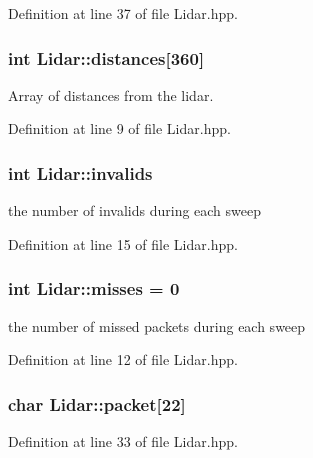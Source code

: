 Definition at line 37 of file Lidar.\-hpp.

\hypertarget{classLidar_a5f97323ace606c1b4d2f817ebb8ebf7d}{
\subsubsection[{distances}]{\setlength{\rightskip}{0pt plus 5cm}int Lidar\-::distances\mbox{[}360\mbox{]}}}\label{classLidar_a5f97323ace606c1b4d2f817ebb8ebf7d}


Array of distances from the lidar. 



Definition at line 9 of file Lidar.\-hpp.

\hypertarget{classLidar_a43a0f4c1f8d6b0c9f1b21be32c99890d}{
\subsubsection[{invalids}]{\setlength{\rightskip}{0pt plus 5cm}int Lidar\-::invalids}}\label{classLidar_a43a0f4c1f8d6b0c9f1b21be32c99890d}
the number of invalids during each sweep 

Definition at line 15 of file Lidar.\-hpp.

\hypertarget{classLidar_a8eea2300d585c1b514ac6211a7326aca}{
\subsubsection[{misses}]{\setlength{\rightskip}{0pt plus 5cm}int Lidar\-::misses = 0}}\label{classLidar_a8eea2300d585c1b514ac6211a7326aca}
the number of missed packets during each sweep 

Definition at line 12 of file Lidar.\-hpp.

\hypertarget{classLidar_a59f93afd1061d31642d1e7755838f2d1}{
\subsubsection[{packet}]{\setlength{\rightskip}{0pt plus 5cm}char Lidar\-::packet\mbox{[}22\mbox{]}\hspace{0.3cm}{\ttfamily [private]}}}\label{classLidar_a59f93afd1061d31642d1e7755838f2d1}


Definition at line 33 of file Lidar.\-hpp.

